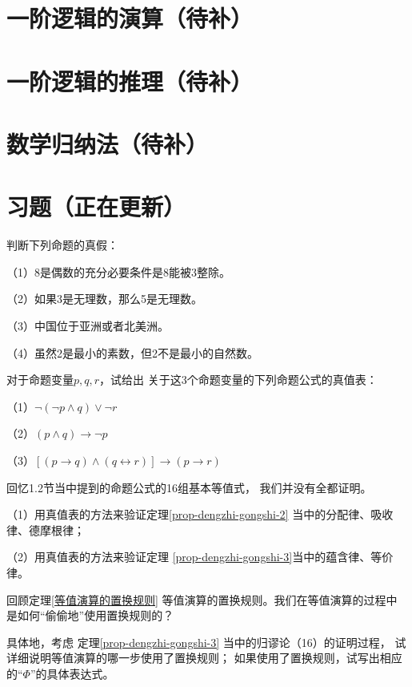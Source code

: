 \section{一阶逻辑的演算（待补）}

\section{一阶逻辑的推理（待补）}
\section{数学归纳法（待补）}
\section{习题（正在更新）}

\begin{prob}判断下列命题的真假：

（1）8是偶数的充分必要条件是8能被$3$整除。

（2）如果3是无理数，那么5是无理数。

（3）中国位于亚洲或者北美洲。

（4）虽然2是最小的素数，但2不是最小的自然数。

\end{prob}\vs

\begin{prob}对于命题变量$p,q,r$，试给出
关于这3个命题变量的下列命题公式的真值表：

（1）$\neg(\neg p\wedge q)\vee\neg r$

（2）$(p\wedge q)\rightarrow\neg p$

（3）$[(p\rightarrow q)\wedge(q\leftrightarrow r)]
\rightarrow(p\rightarrow r)$
\end{prob}\vs

\begin{prob}[基本等值公式的验证]
回忆1.2节当中提到的命题公式的16组基本等值式，
我们并没有全都证明。

（1）用真值表的方法来验证定理\ref{prop-dengzhi-gongshi-2}
当中的分配律、吸收律、德摩根律；

（2）用真值表的方法来验证定理
\ref{prop-dengzhi-gongshi-3}当中的蕴含律、等价律。
\end{prob}\vs

\begin{prob}[关于等值演算的置换规则]
回顾定理\ref{等值演算的置换规则}
等值演算的置换规则。我们在等值演算的过程中
是如何“偷偷地”使用置换规则的？

具体地，考虑
定理\ref{prop-dengzhi-gongshi-3}
当中的归谬论（16）的证明过程，
试详细说明等值演算的哪一步使用了置换规则；
如果使用了置换规则，试写出相应的“$\Phi$”的具体表达式。
\end{prob}\vs

